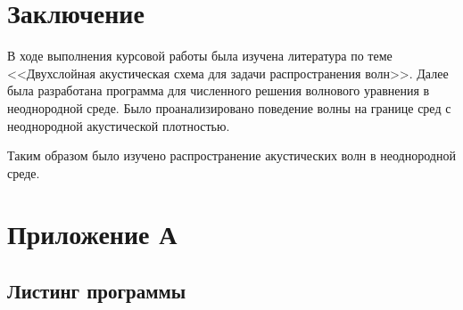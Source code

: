 \documentclass[a4paper, fontsize=14pt]{article}
\begin{document}
\clearpage

\section*{Заключение}
%
В ходе выполнения курсовой работы была изучена литература по теме <<Двухслойная акустическая схема
для задачи распространения волн>>. Далее была разработана программа для численного решения волнового
уравнения в неоднородной среде. Было проанализировано поведение волны на границе сред с неоднородной
акустической плотностью.

Таким образом было изучено распространение акустических волн в неоднородной среде.



\newpage


\printbibliography

\newpage
\section*{Приложение А}
\subsection*{Листинг программы}










\end{document}
